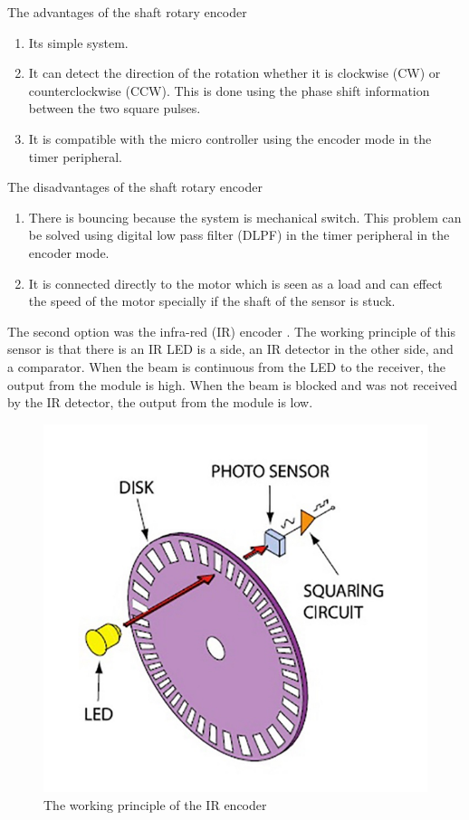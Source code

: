  The advantages of the shaft rotary encoder
\begin{enumerate}
    \item Its simple system.
    \item It can detect the direction of the rotation whether it is clockwise (CW) or counterclockwise (CCW). This is done using the phase shift information between the two square pulses.
    \item It is compatible with the micro controller using the encoder mode in the timer peripheral.
\end{enumerate}

The disadvantages of the shaft rotary encoder
\begin{enumerate}
    \item There is bouncing because the system is mechanical switch. This problem can be solved using digital low pass filter (DLPF) in the timer peripheral in the encoder mode.
    
    \item It is connected directly to the motor which is seen as a load and can effect the speed of the motor specially if the shaft of the sensor is stuck.
    
\end{enumerate}
The second option was the infra-red (IR) encoder .
The working principle of this sensor is that there is an IR LED is a side, an IR detector in the other side, and a comparator. When the beam is continuous from the LED to the receiver, the output from the module is high. When the beam is blocked and was not received by the IR detector, the output from the module is low.

\begin{figure}[h]
    \centering
    \includegraphics[scale=.7]{figuresEncoder/4.jpeg}
    \caption{The working principle of the IR encoder}
\end{figure}

